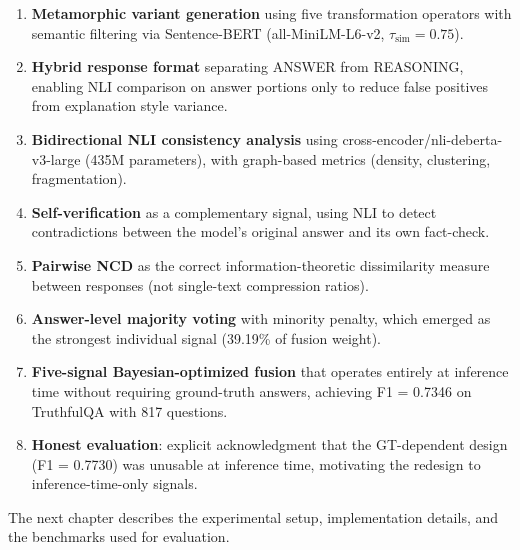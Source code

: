 \begin{enumerate}
    \item \textbf{Metamorphic variant generation} using five transformation operators with semantic filtering via Sentence-BERT (all-MiniLM-L6-v2, $\tau_{\text{sim}} = 0.75$).

    \item \textbf{Hybrid response format} separating ANSWER from REASONING, enabling NLI comparison on answer portions only to reduce false positives from explanation style variance.

    \item \textbf{Bidirectional NLI consistency analysis} using cross-encoder/nli-deberta-v3-large (435M parameters), with graph-based metrics (density, clustering, fragmentation).

    \item \textbf{Self-verification} as a complementary signal, using NLI to detect contradictions between the model's original answer and its own fact-check.

    \item \textbf{Pairwise NCD} as the correct information-theoretic dissimilarity measure between responses (not single-text compression ratios).

    \item \textbf{Answer-level majority voting} with minority penalty, which emerged as the strongest individual signal (39.19\% of fusion weight).

    \item \textbf{Five-signal Bayesian-optimized fusion} that operates entirely at inference time without requiring ground-truth answers, achieving F1 = 0.7346 on TruthfulQA with 817 questions.

    \item \textbf{Honest evaluation}: explicit acknowledgment that the GT-dependent design (F1 = 0.7730) was unusable at inference time, motivating the redesign to inference-time-only signals.
\end{enumerate}

\noindent
The next chapter describes the experimental setup, implementation details, and the benchmarks used for evaluation.

